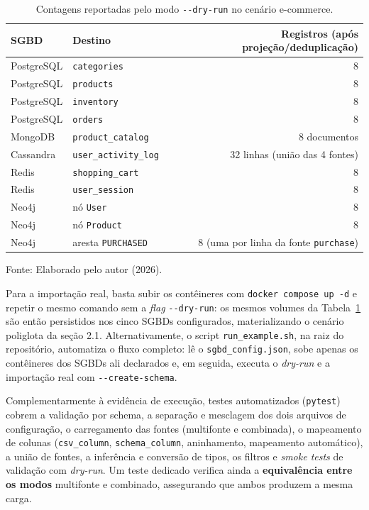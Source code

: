 \begin{table}[H]
  \caption{Contagens reportadas pelo modo \texttt{-{}-dry-run} no cenário e-commerce.}
  \label{tab:dryrun}
  \centering
  \begin{tabular}{l l r}
    \toprule
    \textbf{SGBD} & \textbf{Destino} & \textbf{Registros (após projeção/deduplicação)} \\
    \midrule
    PostgreSQL & \texttt{categories}        & 8 \\
    PostgreSQL & \texttt{products}           & 8 \\
    PostgreSQL & \texttt{inventory}          & 8 \\
    PostgreSQL & \texttt{orders}             & 8 \\
    MongoDB    & \texttt{product\_catalog}   & 8 documentos \\
    Cassandra  & \texttt{user\_activity\_log} & 32 linhas (união das 4 fontes) \\
    Redis      & \texttt{shopping\_cart}     & 8 \\
    Redis      & \texttt{user\_session}      & 8 \\
    Neo4j      & nó \texttt{User}            & 8 \\
    Neo4j      & nó \texttt{Product}         & 8 \\
    Neo4j      & aresta \texttt{PURCHASED}   & 8 (uma por linha da fonte \texttt{purchase}) \\
    \bottomrule
  \end{tabular}
  \par\vspace{4pt}
  {\footnotesize Fonte: Elaborado pelo autor (2026).}
\end{table}

Para a importação real, basta subir os contêineres com \texttt{docker compose up -d} e
repetir o mesmo comando sem a \textit{flag} \texttt{-{}-dry-run}: os mesmos volumes da
Tabela~\ref{tab:dryrun} são então persistidos nos cinco SGBDs configurados,
materializando o cenário poliglota da seção 2.1. Alternativamente, o script
\texttt{run\_example.sh}, na raiz do repositório, automatiza o fluxo completo: lê o
\texttt{sgbd\_config.json}, sobe apenas os contêineres dos SGBDs ali declarados e, em
seguida, executa o \textit{dry-run} e a importação real com \texttt{-{}-create-schema}.

Complementarmente à evidência de execução, testes automatizados (\texttt{pytest}) cobrem
a validação por schema, a separação e mesclagem dos dois arquivos de configuração, o
carregamento das fontes (multifonte e combinada), o mapeamento de colunas
(\texttt{csv\_column}, \texttt{schema\_column}, aninhamento, mapeamento automático), a
união de fontes, a inferência e conversão de tipos, os filtros e \textit{smoke tests} de
validação com \textit{dry-run}. Um teste dedicado verifica ainda a \textbf{equivalência
entre os modos} multifonte e combinado, assegurando que ambos produzem a mesma carga.

